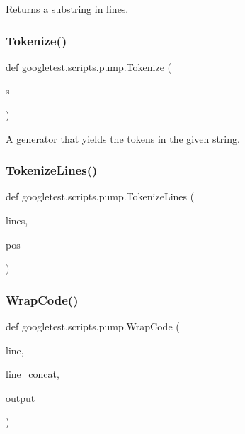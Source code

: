 \begin{DoxyVerb}Returns a substring in lines.\end{DoxyVerb}
 \mbox{\label{namespacegoogletest_1_1scripts_1_1pump_a53a997afde45baf7a888d5f4db9a448e}} 
\subsubsection{\texorpdfstring{Tokenize()}{Tokenize()}}
{\footnotesize\ttfamily def googletest.\+scripts.\+pump.\+Tokenize (\begin{DoxyParamCaption}\item[{}]{s }\end{DoxyParamCaption})}

\begin{DoxyVerb}A generator that yields the tokens in the given string.\end{DoxyVerb}
 \mbox{\label{namespacegoogletest_1_1scripts_1_1pump_acbd154dda1c9a3f0fda16dfe31a099de}} 
\subsubsection{\texorpdfstring{TokenizeLines()}{TokenizeLines()}}
{\footnotesize\ttfamily def googletest.\+scripts.\+pump.\+Tokenize\+Lines (\begin{DoxyParamCaption}\item[{}]{lines,  }\item[{}]{pos }\end{DoxyParamCaption})}

\mbox{\label{namespacegoogletest_1_1scripts_1_1pump_a224bd856240f99990f0f9aaaf38302cd}} 
\subsubsection{\texorpdfstring{WrapCode()}{WrapCode()}}
{\footnotesize\ttfamily def googletest.\+scripts.\+pump.\+Wrap\+Code (\begin{DoxyParamCaption}\item[{}]{line,  }\item[{}]{line\+\_\+concat,  }\item[{}]{output }\end{DoxyParamCaption})}

